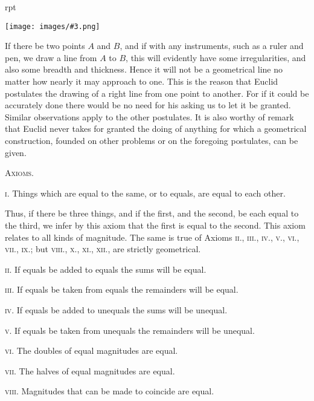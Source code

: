 \documentclass[oneside]{book}
\newcounter{wrapwidth}
\newcommand\imgflow[3]{
\setcounter{wrapwidth}{#1}
\begin{wrapfigure}[#2]{r}{\value{wrapwidth}pt}
\begin{center}
\vspace{-0.3in}
\texttt{[image: images/\#3.png]}
\end{center}
\end{wrapfigure}
}
\begin{document}
\imgflow{100}{3}{f010}
\begin{footnotesize}
If there be two points $A$ and $B$, and if with any instruments,
such as a ruler and pen, we draw a line
from $A$ to $B$, this will evidently have some
irregularities, and also some breadth and
thickness. Hence it will not be a geometrical line no matter how
nearly it may approach to one. This is the reason that Euclid
postulates the drawing of a right line from one point to another.
For if it could be accurately done there would be no need for his
asking us to let it be granted. Similar observations apply to the
other postulates. It is also worthy of remark that Euclid never
takes for granted the doing of anything for which a geometrical
construction, founded on other problems or on the foregoing postulates,
can be given.
\par\end{footnotesize}


\begin{center}
\textsc{Axioms.}
\end{center}

\textsc{i}. Things which are equal to the same, or to equals,
are equal to each other.

\begin{footnotesize}
Thus, if there be three things, and if the first, and the second,
be each equal to the third, we infer by this axiom that the first is
equal to the second. This axiom relates to all kinds of magnitude.
The same is true of Axioms \textsc{ii}., \textsc{iii}., \textsc{iv}., \textsc{v}., \textsc{vi}., \textsc{vii}., \textsc{ix}.;
but \textsc{viii}., \textsc{x}., \textsc{xi}., \textsc{xii}., are strictly geometrical.
\par\end{footnotesize}

\textsc{ii}. If equals be added to equals the sums will be
equal.

\textsc{iii}. If equals be taken from equals the remainders
will be equal.

\textsc{iv}. If equals be added to unequals the sums will be
unequal.

\textsc{v}. If equals be taken from unequals the remainders
will be unequal.

\textsc{vi}. The doubles of equal magnitudes are equal.

\textsc{vii}. The halves of equal magnitudes are equal.

\textsc{viii}. Magnitudes that can be made to coincide are
equal.
\end{document}
